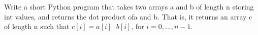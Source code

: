  \label{sssec:ex1_22}

Write a short Python program that takes two arrays a and b of length n storing int values, and returns the dot product ofa and b. That is, it returns an array c of length n such that 
$c[i] = a[i] \cdot b[i]$, for $i = 0,...,n-1$.

